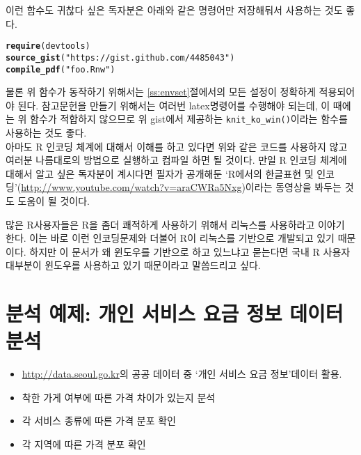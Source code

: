 \documentclass[11pt]{article}\usepackage{graphicx, color}
\makeatletter
\newcommand{\hlfunctioncall}[1]{\textcolor[rgb]{0.501960784313725,0,0.329411764705882}{\textbf{#1}}}%
\newcommand{\hlstring}[1]{\textcolor[rgb]{0.6,0.6,1}{#1}}%
\newenvironment{kframe}{%
 \def\at@end@of@kframe{}%
 \ifinner\ifhmode%
  \def\at@end@of@kframe{\end{minipage}}%
  \begin{minipage}{\columnwidth}%
 \fi\fi%
 \def\FrameCommand##1{\hskip\@totalleftmargin \hskip-\fboxsep
 \colorbox{shadecolor}{##1}\hskip-\fboxsep
     \hskip-\linewidth \hskip-\@totalleftmargin \hskip\columnwidth}%
 \MakeFramed {\advance\hsize-\width
   \@totalleftmargin\z@ \linewidth\hsize
   \@setminipage}}%
 {\par\unskip\endMakeFramed%
 \at@end@of@kframe}
\newenvironment{knitrout}{}{} %
\makeatother
\begin{document}
이런 함수도 귀찮다 싶은 독자분은 아래와 같은 명령어만 저장해둬서 사용하는 것도 좋다.

\begin{knitrout}
\color{fgcolor}\begin{kframe}
\begin{alltt}
\hlfunctioncall{require}(devtools)
\hlfunctioncall{source_gist}(\hlstring{"https://gist.github.com/4485043"})
\hlfunctioncall{compile_pdf}(\hlstring{"foo.Rnw"})
\end{alltt}
\end{kframe}
\end{knitrout}


물론 위 함수가 동작하기 위해서는 \ref{ss:envset}절에서의 모든 설정이 정확하게 적용되어야 된다. 참고문헌을 만들기 위해서는 여러번 latex명령어를 수행해야 되는데, 이 때에는 위 함수가 적합하지 않으므로 위 gist에서 제공하는 \verb|knit_ko_win()|이라는 함수를 사용하는 것도 좋다. 
\\
아마도 R 인코딩 체계에 대해서 이해를 하고 있다면 위와 같은 코드를 사용하지 않고 여러분 나름대로의 방법으로 실행하고 컴파일 하면 될 것이다. 만일 R 인코딩 체계에 대해서 알고 싶은 독자분이 계시다면 필자가 공개해둔 `R에서의 한글표현 및 인코딩'(\url{http://www.youtube.com/watch?v=araCWRa5Nxg})이라는 동영상을 봐두는 것도 도움이 될 것이다. 

많은 R사용자들은 R을 좀더 쾌적하게 사용하기 위해서 리눅스를 사용하라고 이야기 한다. 이는 바로 이런 인코딩문제와 더불어 R이 리눅스를 기반으로 개발되고 있기 때문이다. 하지만 이 문서가 왜 윈도우를 기반으로 하고 있느냐고 묻는다면 국내 R 사용자 대부분이 윈도우를 사용하고 있기 때문이라고 말씀드리고 싶다. 


\section{분석 예제: 개인 서비스 요금 정보 데이터 분석 }

\begin{itemize}
  \item \url{http://data.seoul.go.kr}의 공공 데이터 중 `개인 서비스 요금 정보'데이터 활용.
  \item 착한 가게 여부에 따른 가격 차이가 있는지 분석
  \item 각 서비스 종류에 따른 가격 분포 확인 
  \item 각 지역에 따른 가격 분포 확인 
\end{itemize}
\end{document}
